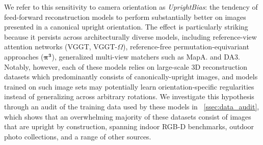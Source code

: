 We refer to this sensitivity to camera orientation as \emph{UprightBias}: the tendency of feed-forward reconstruction models to perform substantially better on images presented in a canonical upright orientation. The effect is particularly striking because it persists across architecturally diverse models, including reference-view attention networks (VGGT, VGGT-$\Omega$), reference-free permutation-equivariant approaches ($\boldsymbol{\pi^3}$), generalized multi-view matchers such as MapA. and DA3.
Notably, however, each of these models relies on large-scale 3D reconstruction datasets which predominantly consists of canonically-upright images, and models trained on such image sets may potentially learn orientation-specific regularities instead of generalizing across arbitrary rotations.
We investigate this hypothesis through an audit of the training data used by these models in ~\cref{ssec:data_audit}, which shows that an overwhelming majority of these datasets consist of images that are upright by construction, spanning indoor RGB-D benchmarks, outdoor photo collections, and a range of other sources. 

